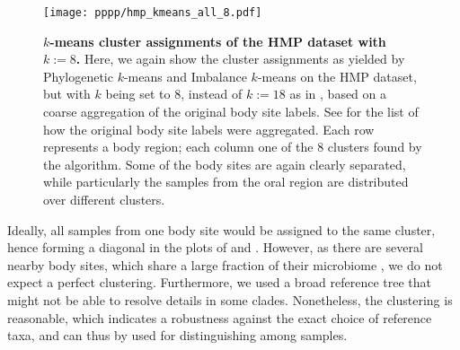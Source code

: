 \begin{figure}[hpbt]
    \centering
    \texttt{[image: pppp/hmp\_kmeans\_all\_8.pdf]}
    \begin{subfigure}{0pt}
        \label{fig:hmp_kmeans_all_8:sub:em_unconstr}
    \end{subfigure}
    \begin{subfigure}{0pt}
        \label{fig:hmp_kmeans_all_8:sub:ei_unconstr}
    \end{subfigure}
    \caption[$k$-means cluster assignments of the \acs{HMP} dataset with $k:=8$]{
        \textbf{$k$-means cluster assignments of the \acs{HMP} dataset with $k:=8$.}
        Here, we again show the cluster assignments as yielded by
         Phylogenetic $k$-means and
         Imbalance $k$-means on the \ac{HMP} dataset,
        but with $k$ being set to 8, instead of $k:=18$ as in ,
        based on a coarse aggregation of the original body site labels.
        See  for the list of how the original body site labels were aggregated.
        Each row represents a body region; each column one of the \num{8} clusters found by the algorithm.
        Some of the body sites are again clearly separated,
        while particularly the samples from the oral region are distributed over different clusters.
    }
    \label{fig:hmp_kmeans_all_8}
\end{figure}

Ideally, all samples from one body site would be assigned to the same cluster,
hence forming a diagonal in the plots of  and .
However, as there are several nearby body sites, which share a large fraction of their microbiome \cite{Huttenhower2012},
we do not expect a perfect clustering.
Furthermore, we used a broad reference tree that might not be able to resolve details in some clades.
Nonetheless, the clustering is reasonable, which indicates a robustness against the exact choice of reference taxa,
and can thus by used for distinguishing among samples.

